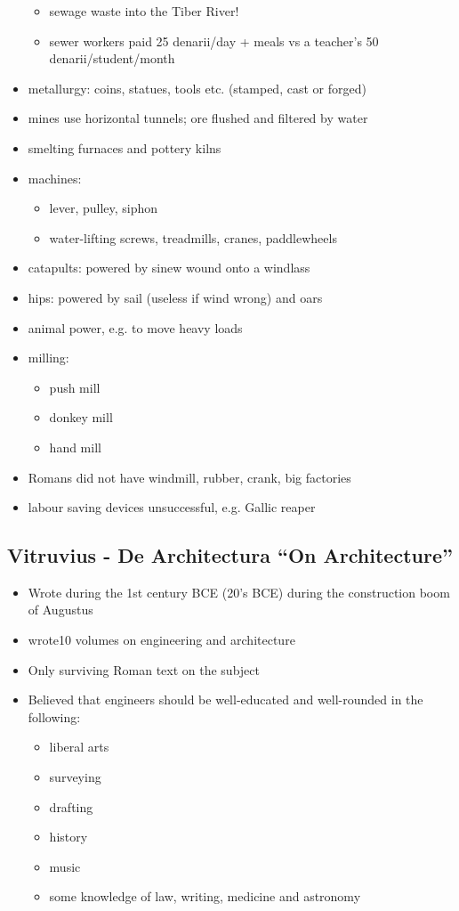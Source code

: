 \documentclass[12pt, twoside]{article}
\begin{document}
\begin{itemize}
\begin{itemize}
	\item sewage waste into the Tiber River!
	\item sewer workers paid 25 denarii/day + meals vs a teacher’s 50 denarii/student/month
	\end{itemize}
\item metallurgy: coins, statues, tools etc. (stamped, cast or forged)
\item mines use horizontal tunnels; ore flushed and filtered by water
\item smelting furnaces and pottery kilns
\item machines:
	\begin{itemize}
	\item lever, pulley, siphon
	\item water-lifting screws, treadmills, cranes, paddlewheels
	\end{itemize}
\item catapults: powered by sinew wound onto a windlass
\item hips: powered by sail (useless if wind wrong) and oars
\item animal power, e.g. to move heavy loads
\item milling:
	\begin{itemize}
	\item push mill
	\item donkey mill
	\item hand mill
	\end{itemize}
\item Romans did not have windmill, rubber, crank, big factories
\item labour saving devices unsuccessful, e.g. Gallic reaper
\end{itemize}

\subsection{Vitruvius - De Architectura “On Architecture”}
\begin{itemize}
\item Wrote during the 1st century BCE (20’s BCE) during the construction boom of Augustus
\item wrote10 volumes on engineering and architecture
\item Only surviving Roman text on the subject
\item Believed that engineers should be well-educated and well-rounded in the following:
	\begin{itemize}
	\item liberal arts
	\item surveying
	\item drafting
	\item history
	\item music
	\item some knowledge of law, writing, medicine and astronomy
	\end{itemize}
\end{itemize}
\end{document}
